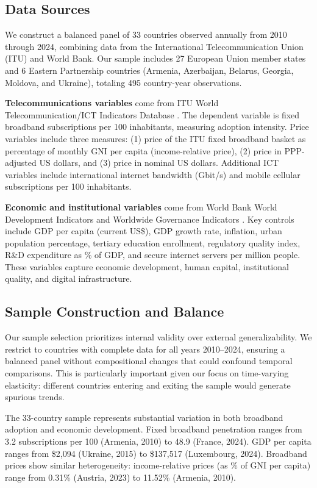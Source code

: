 \subsection{Data Sources}

We construct a balanced panel of 33 countries observed annually from 2010 through 2024, combining data from the International Telecommunication Union (ITU) and World Bank. Our sample includes 27 European Union member states and 6 Eastern Partnership countries (Armenia, Azerbaijan, Belarus, Georgia, Moldova, and Ukraine), totaling 495 country-year observations.

\textbf{Telecommunications variables} come from ITU World Telecommunication/ICT Indicators Database \citep{itu2024data}. The dependent variable is fixed broadband subscriptions per 100 inhabitants, measuring adoption intensity. Price variables include three measures: (1) price of the ITU fixed broadband basket as percentage of monthly GNI per capita (income-relative price), (2) price in PPP-adjusted US dollars, and (3) price in nominal US dollars. Additional ICT variables include international internet bandwidth (Gbit/s) and mobile cellular subscriptions per 100 inhabitants.

\textbf{Economic and institutional variables} come from World Bank World Development Indicators and Worldwide Governance Indicators \citep{worldbank2024wdi, worldbank2024wgi}. Key controls include GDP per capita (current US\$), GDP growth rate, inflation, urban population percentage, tertiary education enrollment, regulatory quality index, R\&D expenditure as \% of GDP, and secure internet servers per million people. These variables capture economic development, human capital, institutional quality, and digital infrastructure.

\subsection{Sample Construction and Balance}

Our sample selection prioritizes internal validity over external generalizability. We restrict to countries with complete data for all years 2010--2024, ensuring a balanced panel without compositional changes that could confound temporal comparisons. This is particularly important given our focus on time-varying elasticity: different countries entering and exiting the sample would generate spurious trends.

The 33-country sample represents substantial variation in both broadband adoption and economic development. Fixed broadband penetration ranges from 3.2 subscriptions per 100 (Armenia, 2010) to 48.9 (France, 2024). GDP per capita ranges from \$2,094 (Ukraine, 2015) to \$137,517 (Luxembourg, 2024). Broadband prices show similar heterogeneity: income-relative prices (as \% of GNI per capita) range from 0.31\% (Austria, 2023) to 11.52\% (Armenia, 2010).

